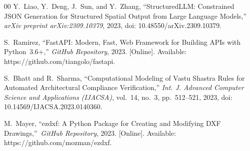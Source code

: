 \documentclass[10pt, twocolumn, letterpaper]{article}
\begin{document}
\begin{thebibliography}{00}
Y.~Liao, Y.~Deng, J.~Sun, and Y.~Zhang,
``StructuredLLM: Constrained JSON Generation for Structured Spatial Output
from Large Language Models,''
\textit{arXiv preprint arXiv:2309.10379}, 2023,
doi: 10.48550/arXiv.2309.10379.

S.~Ramirez,
``FastAPI: Modern, Fast, Web Framework for Building APIs with Python~3.6+,''
\textit{GitHub Repository}, 2023.
[Online]. Available: https://github.com/tiangolo/fastapi.

S.~Bhatt and R.~Sharma,
``Computational Modeling of Vastu Shastra Rules for Automated Architectural
Compliance Verification,''
\textit{Int. J. Advanced Computer Science and Applications (IJACSA)},
vol.~14, no.~3, pp.~512--521, 2023,
doi: 10.14569/IJACSA.2023.0140360.


M.~Mayer,
``ezdxf: A Python Package for Creating and Modifying DXF Drawings,''\
\textit{GitHub Repository}, 2023.
[Online]. Available: https://github.com/mozman/ezdxf.

\end{thebibliography}
\end{document}

